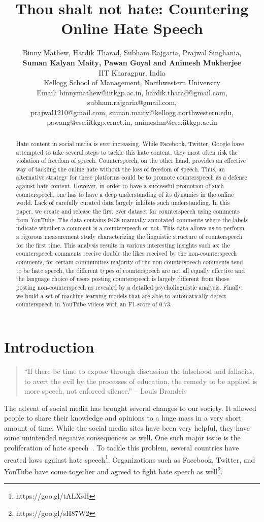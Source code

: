 \documentclass[11pt,a4paper]{article}
\title{Thou shalt not hate: Countering Online Hate Speech}
\author{Binny Mathew, Hardik Tharad, Subham Rajgaria,  Prajwal Singhania,\\
\textbf{Suman Kalyan Maity\textsuperscript{}, Pawan Goyal and Animesh Mukherjee}\\
IIT Kharagpur, India\\
\textsuperscript{}Kellogg School of Management, Northwestern University\\
Email: binnymathew@iitkgp.ac.in, hardik.tharad@gmail.com, subham.rajgaria@gmail.com, \\
prajwal1210@gmail.com, 
suman.maity@kellogg.northwestern.edu, \\
pawang@cse.iitkgp.ernet.in, 
animeshm@cse.iitkgp.ac.in
}
\date{}
\begin{document}
\maketitle
\begin{abstract}
Hate content in social media is ever increasing. While Facebook, Twitter, Google have attempted to take several steps to tackle this hate content, they most often risk the violation of freedom of speech. Counterspeech, on the other hand, provides an effective way of tackling the online hate without the loss of freedom of speech. Thus, an alternative strategy for these platforms could be to promote counterspeech as a defense against hate content. However, in order to have a successful promotion of such counterspeech, one has to have a deep understanding of its dynamics in the online world. Lack of carefully curated data largely inhibits such understanding. In this paper, we create and release the first ever dataset for counterspeech using comments from YouTube. The data contains 9438 manually annotated comments where the labels indicate whether a comment is a counterspeech or not. This data allows us to perform a rigorous measurement study characterizing the linguistic structure of counterspeech for the first time. This analysis results in various interesting insights such as: the counterspeech comments receive double the likes received by the non-counterspeech comments, for certain communities majority of the non-counterspeech comments tend to be hate speech, the different types of counterspeech are not all equally effective and the language choice of users posting counterspeech is largely different from those posting non-counterspeech as revealed by a detailed psycholinguistic analysis. Finally, we build a set of machine learning models that are able to automatically detect counterspeech in YouTube videos with an F1-score of 0.73. 
\end{abstract}


\section{Introduction}

\begin{quote}
``If there be time to expose through discussion the falsehood and fallacies, to avert the evil by the processes of education, the remedy to be applied is more speech, not enforced silence.'' -- Louis Brandeis  
\end{quote}

\vspace{-5mm}
The advent of social media has brought several changes to our society. It allowed people to share their knowledge and opinions to a huge mass in a very short amount of time. While the social media sites have been very helpful, they have some unintended negative consequences as well. One such major issue is the proliferation of hate speech~\cite{massaro1990equality}. To tackle this problem, several countries have created laws against hate speech\footnote{https://goo.gl/tALXsH}. Organizations such as Facebook, Twitter, and YouTube have come together and agreed to fight hate speech as well\footnote{https://goo.gl/sH87W2}.
\end{document}
